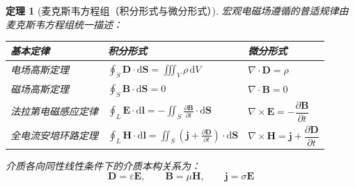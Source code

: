 \documentclass[11pt,a4paper,fontset=fandol]{ctexart}
\newtheorem{theorem}{定理}[section]
\theoremstyle{remark}
\begin{document}
\begin{theorem}[麦克斯韦方程组（积分形式与微分形式）]
宏观电磁场遵循的普适规律由麦克斯韦方程组统一描述：
\begin{table}[htbp]
\centering
\small
\renewcommand{\arraystretch}{1.5}
\begin{tabular}{lll}
\toprule
\textbf{基本定律} & \textbf{积分形式} & \textbf{微分形式} \\
\midrule
电场高斯定理 & $\displaystyle\oint_S \bm{D} \cdot \mathrm{d}\bm{S} = \iiint_V \rho\,\mathrm{d}V$ & $\nabla \cdot \bm{D} = \rho$ \\[3mm]
磁场高斯定理 & $\displaystyle\oint_S \bm{B} \cdot \mathrm{d}\bm{S} = 0$ & $\nabla \cdot \bm{B} = 0$ \\[3mm]
法拉第电磁感应定律 & $\displaystyle\oint_L \bm{E} \cdot \mathrm{d}\bm{l} = -\iint_S \frac{\partial \bm{B}}{\partial t}\cdot\mathrm{d}\bm{S}$ & $\nabla \times \bm{E} = -\dfrac{\partial \bm{B}}{\partial t}$ \\[3mm]
全电流安培环路定理 & $\displaystyle\oint_L \bm{H} \cdot \mathrm{d}\bm{l} = \iint_S \left(\bm{j} + \frac{\partial \bm{D}}{\partial t}\right)\cdot\mathrm{d}\bm{S}$ & $\nabla \times \bm{H} = \bm{j} + \dfrac{\partial \bm{D}}{\partial t}$ \\
\bottomrule
\end{tabular}
\end{table}
介质各向同性线性条件下的介质本构关系为：
\begin{equation}
    \bm{D} = \varepsilon \bm{E}, \qquad \bm{B} = \mu \bm{H}, \qquad \bm{j} = \sigma \bm{E}
\end{equation}
\end{theorem}
\end{document}
